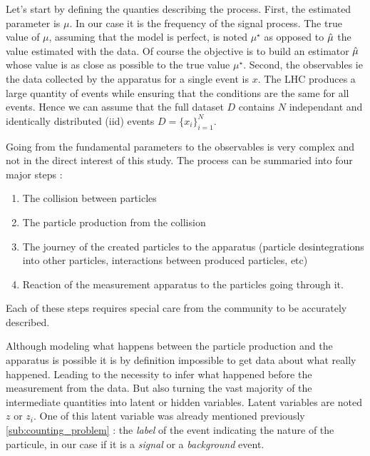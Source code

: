 Let's start by defining the quanties describing the process.
First, the estimated parameter is $\mu$.
In our case it is the frequency of the signal process.
The true value of $\mu$, assuming that the model is perfect, is noted $\mu^\star$ as opposed to $\hat\mu$ the value estimated with the data.
Of course the objective is to build an estimator $\hat\mu$ whose value is as close as possible to the true value $\mu^\star$.
Second, the observables ie the data collected by the apparatus for a single event is $x$.
The LHC produces a large quantity of events while ensuring that the conditions are the same for all events.
Hence we can assume that the full dataset $D$ contains $N$ independant and identically distributed (iid) events $D = \{x_i\}_{i=1}^N$.

Going from the fundamental parameters to the observables is very complex and not in the direct interest of this study.
The process can be summaried into four major steps :
\begin{enumerate}
	\item The collision between particles
	\item The particle production from the collision
	\item The journey of the created particles to the apparatus (particle desintegrations into other particles, interactions between produced particles, etc)
	\item Reaction of the measurement apparatus to the particles going through it.
\end{enumerate}

Each of these steps requires special care from the community to be accurately described.

Although modeling what happens between the particle production and the apparatus is possible it is by definition impossible to get data about what really happened.
Leading to the necessity to infer what happened before the measurement from the data.
But also turning the vast majority of the intermediate quantities into latent or hidden variables.
Latent variables are noted $z$ or $z_i$.
One of this latent variable was already mentioned previously \autoref{sub:counting_problem} : the \emph{label} of the event indicating the nature of the particule, in our case if it is a \emph{signal} or a \emph{background} event.


